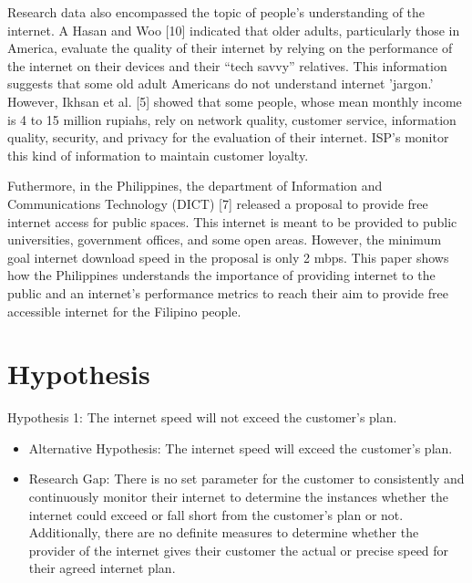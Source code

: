 \documentclass[conference]{IEEEtran}
\begin{document}
Research data also encompassed the topic of people's understanding of the internet. A Hasan and Woo [10] indicated that older adults, particularly those in America, evaluate the quality of their internet by relying on the performance of the internet on their devices and their “tech savvy” relatives. This information suggests that some old adult Americans do not understand internet 'jargon.' However, Ikhsan et al. [5] showed that some people, whose mean monthly income is 4 to 15 million rupiahs, rely on network quality, customer service, information quality, security, and privacy for the evaluation of their internet. ISP's monitor this kind of information to maintain customer loyalty.

Futhermore, in the Philippines, the department of Information and Communications Technology (DICT) [7] released a proposal to provide free internet access for public spaces. This internet is meant to be provided to public universities, government offices, and some open areas. However, the minimum goal internet download speed in the proposal is only 2 mbps. This paper shows how the Philippines understands the importance of providing internet to the public and an internet's performance metrics to reach their aim to provide free accessible internet for the Filipino people.

\section{Hypothesis}
Hypothesis 1: The internet speed will not exceed the customer's plan.
\begin{itemize}
    \item Alternative Hypothesis: The internet speed will exceed the customer's plan.
    \item Research Gap: There is no set parameter for the customer to consistently and continuously monitor their internet to determine the instances whether the internet could exceed or fall short from the customer's plan or not. Additionally, there are no definite measures to determine whether the provider of the internet gives their customer the actual or precise speed for their agreed internet plan.
\end{itemize}
\end{document}
